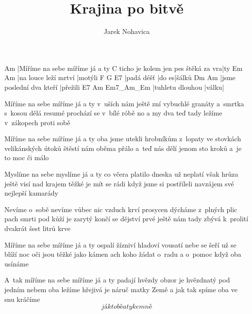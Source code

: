 \documentclass{song}
\author{Jarek Nohavica}
\title{Krajina po bitvě}
\begin{document}
\strophe
Am
|Míříme na sebe míříme já a ty
                                   C
ticho je kolem jen pes štěká za vra|ty
Em                   Am
|na louce leží mrtví |motýli
F          G     E7
|padá déšť |do es|šálků
Dm                       Am
|jsme poslední dva kteří |přežili
E7               Am    Em7_Am_Em
|tuhletu dlouhou |válku|
\endstrophe

\begin{multicols}{2}
\strophe*
Míříme na sebe míříme já a ty
v~uších nám ještě zní vybuchlé granáty
a~smrtka s~kosou dělá resumé
prochází se v~bílé róbě
no a my dva teď tady ležíme
v~zákopech proti sobě
\endstrophe

\strophe*
Míříme na sebe míříme já a ty
oba jsme utekli hrobníkům z~lopaty
ve stovkách velikánských útoků
štěstí nám oběma přálo
a~teď nás dělí jenom sto kroků
a~je to moc či málo
\endstrophe

\strophe*
Myslíme na sebe myslíme já a ty
co včera platilo dneska už neplatí
však hrůza ještě visí nad krajem
těžké je mít se rádi
když jsme si postříleli navzájem
své nejlepší kamarády
\endstrophe

\strophe*
Nevíme o~sobě nevíme vůbec nic
vzduch krví prosycen dýcháme z~plných plic
pach smrti pod kůží je zarytý
končí se dějství prvé
ještě nám tady zbývá k~prolití
dvakrát šest litrů krve
\endstrophe

\strophe*
Míříme na sebe míříme já a ty
ospalí žízniví hladoví vousatí
nebe se šeří už se blíží noc
oči jsou těžké jako kámen
ach koho žádat o~radu a o~pomoc
když oba usínáme
\endstrophe

\strophe*
A~tak míříme na sebe míříme já a ty
padají hvězdy obzor je hvězdnatý
pod jedním nebem oba ležíme
hřejivá je náruč matky Země
a jak tak spíme oba ve snu kráčíme
\[ já k tobě a ty ke mně \]
\endstrophe
\end{multicols}
\end{document}
